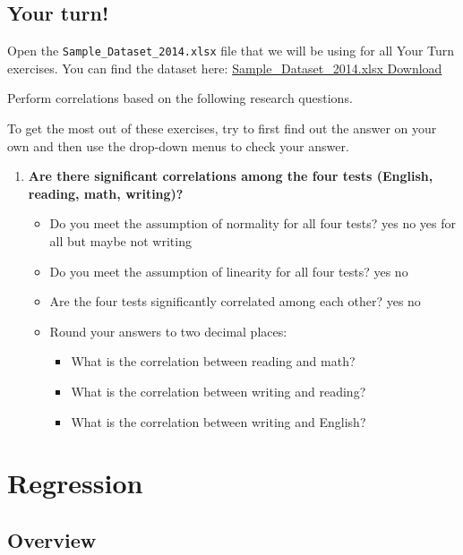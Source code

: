 \documentclass[
]{book}
\begin{document}
\hypertarget{your-turn-8}{%
\subsection{Your turn!}\label{your-turn-8}}

Open the \texttt{Sample\_Dataset\_2014.xlsx} file that we will be using for all Your Turn exercises. You can find the dataset here: \href{https://github.com/danawanzer/stats-with-jamovi/blob/master/data/Sample_Dataset_2014.xlsx}{Sample\_Dataset\_2014.xlsx Download}

Perform correlations based on the following research questions.

To get the most out of these exercises, try to first find out the answer on your own and then use the drop-down menus to check your answer.

\begin{enumerate}
\def\labelenumi{\arabic{enumi}.}
\item
  \textbf{Are there significant correlations among the four tests (English, reading, math, writing)?}

  \begin{itemize}
  \item
    Do you meet the assumption of normality for all four tests? yes no yes for all but maybe not writing
  \item
    Do you meet the assumption of linearity for all four tests? yes no
  \item
    Are the four tests significantly correlated among each other? yes no
  \item
    Round your answers to two decimal places:

    \begin{itemize}
    \item
      What is the correlation between reading and math?
    \item
      What is the correlation between writing and reading?
    \item
      What is the correlation between writing and English?
    \end{itemize}
  \end{itemize}
\end{enumerate}

\hypertarget{regression}{%
\section{Regression}\label{regression}}

\hypertarget{overview-11}{%
\subsection{Overview}\label{overview-11}}
\end{document}
